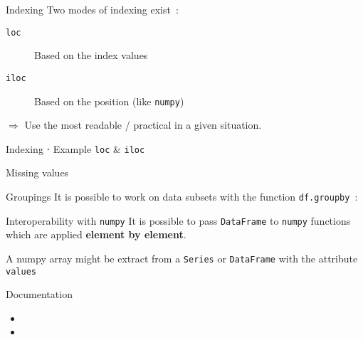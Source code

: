 \begin{frame}{Indexing}
  Two modes of indexing exist~:
  \begin{description}
    \item[\texttt{loc}] Based on the index values
    \item[\texttt{iloc}] Based on the position (like \texttt{numpy})
  \end{description}
  $\Rightarrow$ Use the most readable / practical in a given situation.
\end{frame}

\begin{frame}{Indexing ⋅ Example \texttt{loc} \& \texttt{iloc}}
\end{frame}

\begin{frame}{Missing values}
\end{frame}

\begin{frame}{Groupings}
  It is possible to work on data subsets with the function \texttt{df.groupby}~:
\end{frame}

\begin{frame}{Interoperability with \texttt{numpy}}
  It is possible to pass \texttt{DataFrame}  to \texttt{numpy} functions which are applied \textbf{element by element}.

  A numpy array might be extract from a \texttt{Series} or \texttt{DataFrame} with the attribute \texttt{values}

\end{frame}

\begin{frame}{Documentation}
  \begin{itemize}
    \item {}
    \item {}
  \end{itemize}
\end{frame}